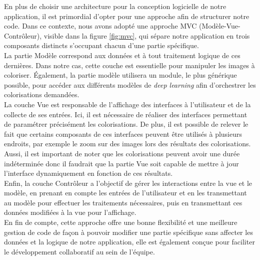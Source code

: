 \documentclass{article}
\begin{document}
En plus de choisir une architecture pour la conception logicielle de notre application, il est primordial d'opter pour une approche afin de structurer notre code.
Dans ce contexte, nous avons adopté une approche MVC (Modèle-Vue-Contrôleur), visible dans la figure \ref{fig:mvc}, qui sépare notre application en trois composants distincts s'occupant chacun d'une partie spécifique. \\ 

La partie Modèle correspond aux données et à tout traitement logique de ces dernières. Dans notre cas, cette couche est essentielle pour manipuler les images à coloriser. Également, la partie modèle utilisera un module, le plus générique possible, pour accéder aux différents modèles de \emph{deep learning} afin d'orchestrer les colorisations demandées. \\

La couche Vue est responsable de l'affichage des interfaces à l'utilisateur et de la collecte de ses entrées. Ici, il est nécessaire de réaliser des interfaces permettant de paramétrer précisément les colorisations. De plus, il est possible de relever le fait que certains composants de ces interfaces peuvent être utilisés à plusieurs endroits, par exemple le zoom sur des images lors des résultats des colorisations. Aussi, il est important de noter que les colorisations peuvent avoir une durée indéterminée donc il faudrait que la partie Vue soit capable de mettre à jour l'interface dynamiquement en fonction de ces résultats. \\

Enfin, la couche Contrôleur a l'objectif de gérer les interactions entre la vue et le modèle, en prenant en compte les entrées de l'utilisateur et en les transmettant au modèle pour effectuer les traitements nécessaires, puis en transmettant ces données modifiées à la vue pour l'affichage. \\

En fin de compte, cette approche offre une bonne flexibilité et une meilleure gestion de code de façon à pouvoir modifier une partie spécifique sans affecter les données et la logique de notre application, elle est également conçue pour faciliter le développement collaboratif au sein de l'équipe. \\
\end{document}
